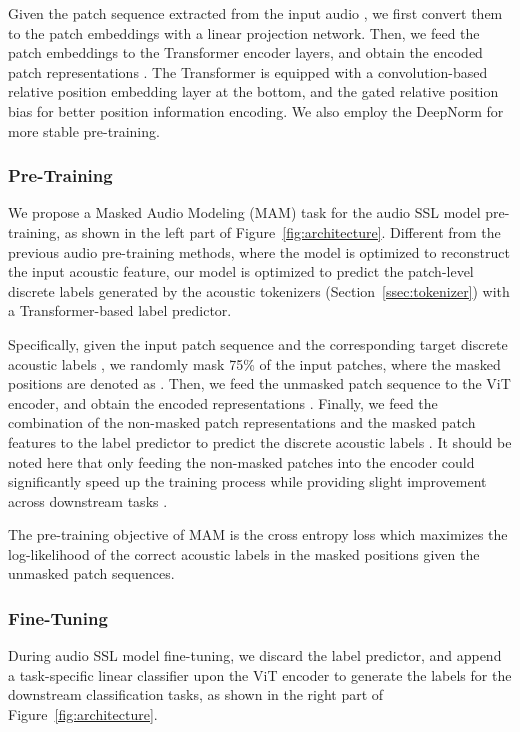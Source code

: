 \documentclass{article}
\theoremstyle{plain}
\theoremstyle{definition}
\theoremstyle{remark}
\begin{document}
Given the patch sequence extracted from the input audio , we first convert them to the patch embeddings  with a linear projection network.
Then, we feed the patch embeddings to the Transformer encoder layers, and obtain the encoded patch representations . The Transformer is equipped with a convolution-based relative position embedding layer at the bottom, and the gated relative position
bias \citep{chi2022xlm} for better position information encoding. We also employ the DeepNorm \citep{wang2022deepnet} for more stable pre-training.

\subsubsection{Pre-Training}

We propose a Masked Audio Modeling (MAM) task for the audio SSL model pre-training, as shown in the left part of Figure~\ref{fig:architecture}.
Different from the previous audio pre-training methods, where the model is optimized to reconstruct the input acoustic feature, our model 
 is optimized to predict the patch-level discrete labels generated by the acoustic tokenizers (Section~\ref{ssec:tokenizer}) with a Transformer-based label predictor. 

Specifically, given the input patch sequence  and the corresponding target discrete acoustic labels , we randomly mask 75\% of the input patches, where the masked positions are denoted as .
Then, we feed the unmasked patch sequence  to the ViT encoder, and obtain the encoded representations .
Finally, we feed the combination of the non-masked patch representations and the masked patch features  to the label predictor to predict the discrete acoustic labels . It should be noted here that only feeding the non-masked patches into the encoder could significantly speed up the training process while providing slight improvement across downstream tasks \citep{xu2022masked}.

The pre-training objective of MAM is the cross entropy loss which maximizes the log-likelihood of the correct acoustic labels in the masked positions given the unmasked patch sequences.


\subsubsection{Fine-Tuning}

During audio SSL model fine-tuning, we discard the label predictor, and append a task-specific linear classifier upon the ViT encoder to generate the labels for the downstream classification tasks, as shown in the right part of Figure~\ref{fig:architecture}.
\end{document}
